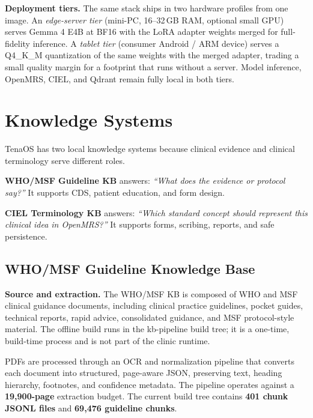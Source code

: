 \documentclass[11pt]{article}
\newcommand{\Product}{TenaOS}
\newcommand{\Gemma}{Gemma 4 E4B}
\newcommand{\OpenMRS}{OpenMRS}
\newcommand{\CIEL}{CIEL}
\newcommand{\WHO}{WHO/MSF}
\newcommand{\code}[1]{{\setlength{\fboxsep}{1.7pt}\colorbox{codebg}{\textcolor{codeink}{\small\ttfamily #1}}}}
\begin{document}
\textbf{Deployment tiers.} The same stack ships in two hardware profiles from one image. An \emph{edge-server tier} (mini-PC, 16--32\,GB RAM, optional small GPU) serves \Gemma{} at BF16 with the LoRA adapter weights merged for full-fidelity inference. A \emph{tablet tier} (consumer Android / ARM device) serves a \code{Q4\_K\_M} quantization of the same weights with the merged adapter, trading a small quality margin for a footprint that runs without a server. Model inference, \OpenMRS{}, \CIEL{}, and Qdrant remain fully local in both tiers.

\section{Knowledge Systems}

\Product{} has two local knowledge systems because clinical evidence and clinical terminology serve different roles.

\begin{infobox}
\textbf{WHO/MSF Guideline KB} answers: \emph{``What does the evidence or protocol say?''} It supports CDS, patient education, and form design.

\smallskip
\textbf{CIEL Terminology KB} answers: \emph{``Which standard concept should represent this clinical idea in OpenMRS?''} It supports forms, scribing, reports, and safe persistence.
\end{infobox}

\subsection{WHO/MSF Guideline Knowledge Base}

\textbf{Source and extraction.} The \WHO{} KB is composed of WHO and MSF clinical guidance documents, including clinical practice guidelines, pocket guides, technical reports, rapid advice, consolidated guidance, and MSF protocol-style material. The offline build runs in the \code{kb-pipeline} build tree; it is a one-time, build-time process and is not part of the clinic runtime.

PDFs are processed through an OCR and normalization pipeline that converts each document into structured, page-aware JSON, preserving text, heading hierarchy, footnotes, and confidence metadata. The pipeline operates against a \textbf{19,900-page} extraction budget. The current build tree contains \textbf{401 chunk JSONL files} and \textbf{69,476 guideline chunks}.
\end{document}

